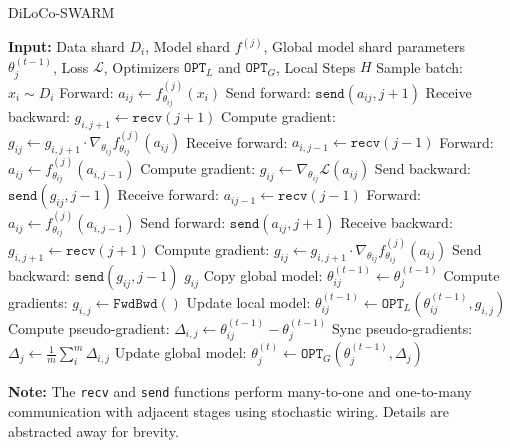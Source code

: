\documentclass{article}
\begin{document}
\begin{algorithm}
\caption{DiLoCo-SWARM}
\label{alg:diloco-swarm}
\begin{algorithmic}[1]
\State \textbf{Input:} Data shard $D_i$, Model shard $f^{(j)}$, Global model shard parameters $\theta_{j}^{(t-1)}$, Loss $\mathcal{L}$, Optimizers $\mathtt{OPT}_{L}$ and $\mathtt{OPT}_{G}$, Local Steps $H$
   
    \State Sample batch: $x_i \sim D_i$
    \State Forward: $a_{ij} \gets f^{(j)}_{\theta_{ij}}(x_i)$
    \State Send forward: $\mathtt{send}(a_{ij}, j+1)$ 
    \State Receive backward: $g_{i,j+1} \gets \mathtt{recv}(j+1)$
    \State Compute gradient: $g_{ij} \gets g_{i,j+1} \cdot \nabla_{\theta_{ij}} f^{(j)}_{\theta_{ij}}(a_{ij})$
   
    \State Receive forward: $a_{i,j-1} \gets \mathtt{recv}(j-1)$
    \State Forward: $a_{ij} \gets f^{(j)}_{\theta_{ij}}(a_{i,j-1})$
    \State Compute gradient: $g_{ij} \gets \nabla_{\theta_{ij}} \mathcal{L}(a_{ij})$
    \State Send backward: $\mathtt{send}(g_{ij}, j-1)$
  \Else {}
    \State Receive forward: $a_{ij-1} \gets \mathtt{recv}(j-1)$
    \State Forward: $a_{ij} \gets f^{(j)}_{\theta_{ij}}(a_{i,j-1})$
    \State Send forward: $\mathtt{send}(a_{ij}, j+1)$
    \State Receive backward: $g_{i,j+1} \gets \mathtt{recv}(j+1)$
    \State Compute gradient: $g_{ij} \gets g_{i,j+1} \cdot \nabla_{\theta_{ij}} f^{(j)}_{\theta_{ij}}(a_{ij})$
    \State Send backward: $\mathtt{send}(g_{ij}, j-1)$
  \EndIf
  \Return $g_{ij}$
\EndProcedure
\State Copy global model: $\theta_{ij}^{(t-1)} \gets \theta_j^{(t-1)}$
  \State Compute gradients: $g_{i,j} \gets \mathtt{FwdBwd}()$
  \State Update local model: $\theta_{ij}^{(t-1)} \gets \mathtt{OPT}_{L}(\theta_{ij}^{(t-1)}, g_{i,j})$
\EndFor
\State Compute pseudo-gradient: $\Delta_{i,j} \gets \theta_{ij}^{(t-1)} - \theta_j^{(t-1)}$
\State Sync pseudo-gradients: $\Delta_j \gets \frac{1}{m}\sum_i^m \Delta_{i,j}$
\State Update global model: $\theta_j^{(t)} \gets \mathtt{OPT}_{G}(\theta_j^{(t-1)}, \Delta_j)$
\end{algorithmic}
\begin{minipage}{\linewidth}
\vspace{1.5ex}
\small
\textbf{Note:} The \texttt{recv} and \texttt{send} functions perform many-to-one and one-to-many communication with adjacent stages using
stochastic wiring. Details are abstracted away for brevity.
\end{minipage}
\end{algorithm}
\end{document}
